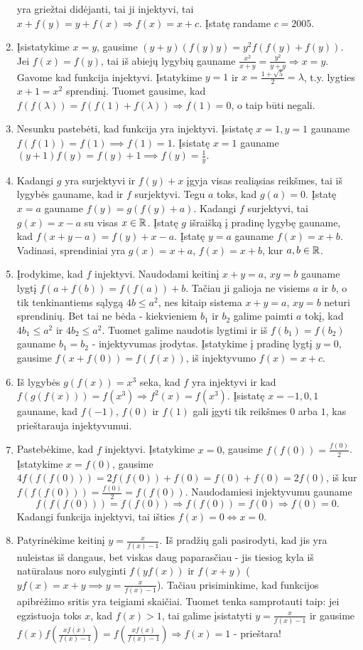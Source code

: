 \begin{enumerate}
    yra griežtai didėjanti, tai ji injektyvi, tai $x+f(y)=y+f(x)
    \Rightarrow f(x)=x+c$. Įstatę randame $c=2005$.
\item
    Įsistatykime $x=y$, gausime $(y+y)(f(y)y)=y^2f(f(y)+f(y))$. Jei
    $f(x)=f(y)$, tai iš abiejų lygybių gauname $\frac{x^2}{x+y} =
    \frac{y^2}{y+y} \Rightarrow x=y$. Gavome kad funkcija injektyvi.
    Įstatykime $y=1$ ir $x=\frac{1+\sqrt{5}}{2}=\lambda$, t.y. lygties
    $x+1=x^2$ sprendinį. Tuomet gausime, kad
    $f(f(\lambda))=f(f(1)+f(\lambda))\Rightarrow f(1)=0$, o taip būti
    negali.
\item
    Nesunku pastebėti, kad funkcija yra injektyvi. Įsistatę $x=1,y=1$
    gauname $f(f(1))=f(1) \implies f(1)=1$. Įsistatę $x=1$ gauname
    $(y+1)f(y)=f(y)+1 \implies f(y)=\frac{1}{y}.$
\item
    Kadangi $g$ yra surjektyvi ir $f(y)+x$ įgyja visas realiąsias reikšmes,
    tai iš lygybės gauname, kad ir $f$ surjektyvi. Tegu $a$ toks, kad
    $g(a) = 0$. Įstatę $x=a$ gauname $f(y)=g(f(y)+a)$. Kadangi $f$
    surjektyvi, tai $g(x)=x-a$ su visas $x\in \mathbb R$. Įstatę $g$ išraišką į
    pradinę lygybę gauname, kad $f(x+y-a)=f(y)+x-a$. Įstatę $y=a$ gauname
    $f(x)=x+b$. Vadinasi, sprendiniai yra $g(x) =x+a$, $f(x)=x+b$, kur $a,b
    \in \mathbb R$.
\item
    Įrodykime, kad $f$ injektyvi. Naudodami keitinį $x+y =a$, $xy =b$
    gauname lygtį $f(a+f(b))=f(f(a)) + b$.  Tačiau ji galioja ne visiems
    $a$ ir $b$, o tik tenkinantiems sąlygą $4b\leq a^2$, nes kitaip
    sistema $x+y =a$, $xy =b$ neturi sprendinių.  Bet tai ne bėda -
    kiekvieniem $b_1$ ir $b_2$ galime paimti $a$ tokį, kad $4b_1 \leq a^2$
    ir $4b_2 \leq a^2$. Tuomet galime naudotis lygtimi ir iš
    $f(b_1)=f(b_2)$ gauname $b_1 = b_2$ - injektyvumas įrodytas.
    Įstatykime į pradinę lygtį $y=0$, gausime $f(x + f(0))=f(f(x))$, iš
    injektyvumo $f(x)=x+c$.
\item
    Iš lygybės $g(f(x))=x^3$ seka, kad $f$ yra injektyvi ir kad
    $f(g(f(x)))=f(x^3)\Rightarrow f^2(x)=f(x^3)$.  Įsistatę $x=-1,0,1$
    gauname, kad $f(-1)$, $f(0)$ ir $f(1)$ gali įgyti tik reikšmes $0$
    arba $1$, kas prieštarauja injektyvumui.
\item
    Pastebėkime, kad $f$ injektyvi. Įstatykime $x = 0$, gausime
    $f(f(0))=\frac{f(0)}{2}$.  Įstatykime $x = f(0)$, gausime $4f(f(f(0)))
    = 2f(f(0)) + f(0) = f(0) + f(0) = 2f(0)$, iš kur
    $f(f(f(0)))=\frac{f(0)}{2} = f(f(0))$. Naudodamiesi injektyvumu
    gauname $$f(f(f(0)))=f(f(0)) \Rightarrow f(f(0)) = f(0) \Rightarrow
    f(0) = 0.$$ Kadangi funkcija injektyvi, tai išties $f(x)=0
    \Leftrightarrow x=0$.
\item
    Patyrinėkime keitinį $y=\frac{x}{f(x)-1}$. Iš pradžių gali pasirodyti,
    kad jis yra nuleistas iš dangaus, bet viskas daug paparasčiau - jis
    tiesiog kyla iš natūralaus noro sulyginti $f(yf(x))$ ir $f(x+y)$
    ($yf(x)=x+y\implies y=\frac{x}{f(x)-1}$). Tačiau prisiminkime, kad
    funkcijos apibrėžimo sritis yra teigiami skaičiai. Tuomet tenka
    samprotauti taip: jei egzistuoja toks $x$, kad $f(x)>1$, tai galime
    įsistatyti $y=\frac{x}{f(x)-1}$ ir gausime
    $f(x)f(\frac{xf(x)}{f(x)-1})=f(\frac{xf(x)}{f(x)-1}) \Rightarrow
    f(x)=1$ - prieštara!
    

\end{enumerate}
